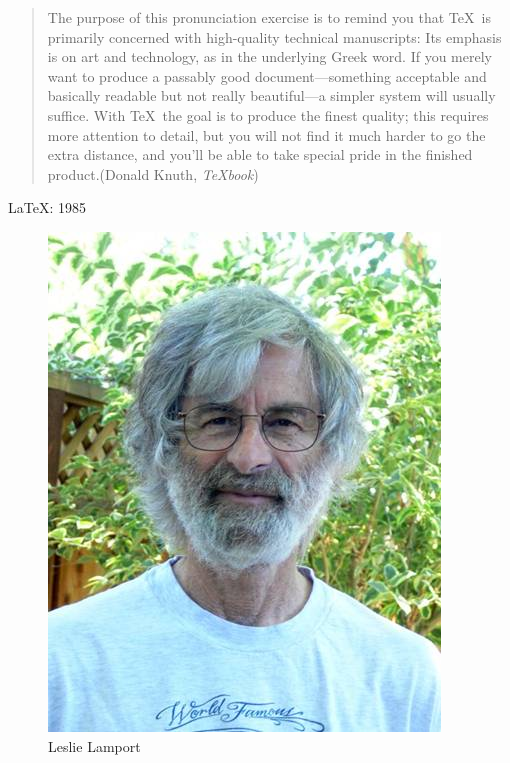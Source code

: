 \begin{frame}
  \Huge
\end{frame}

\begin{frame}
  \large
  \begin{quote}
    The purpose of this pronunciation exercise is to remind you that \TeX\ is
    primarily concerned with high-quality technical manuscripts: Its emphasis
    is on art and technology, as in the underlying Greek word. If you merely
    want to produce a passably good document—something acceptable and basically
    readable but not really beautiful—a simpler system will usually suffice.
    With \TeX\ the goal is to produce the finest quality; this requires more
    attention to detail, but you will not find it much harder to go the extra
    distance, and you’ll be able to take special pride in the finished
    product.\hfill (Donald Knuth, \emph{\TeX book})
  \end{quote}
\end{frame}

\begin{frame}
  \Huge
  \LaTeX: 1985
\end{frame}

\begin{frame}[plain]
  \begin{figure}[h]
    \includegraphics[scale=.5]{imagens/lamport}
    \caption{Leslie Lamport}
  \end{figure}
\end{frame}
